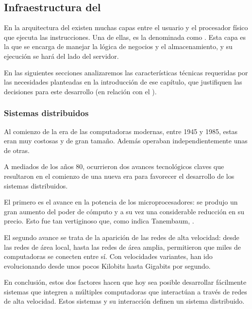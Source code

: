 
\subsection{Infraestructura del }
\label{marco_teorico}

En la arquitectura del  existen muchas capas entre el usuario y el procesador físico que ejecuta las instrucciones. Una de ellas, es la denominada como . Esta capa es la que se encarga de manejar la lógica de negocios y el almacenamiento, y su ejecución se hará del lado del servidor.

En las siguientes secciones analizaremos las características técnicas requeridas por las necesidades planteadas en la introducción de ese capítulo, que justifiquen las decisiones para este desarrollo (en relación con el ).

\subsubsection{Sistemas distribuidos}
\label{sistemas_distribuidos}

Al comienzo de la era de las computadoras modernas, entre 1945 y 1985, estas eran muy costosas y de gran tamaño. Además operaban independientemente unas de otras.

A mediados de los años 80, ocurrieron dos avances tecnológicos claves que resultaron en el comienzo de una nueva era para favorecer el desarrollo de los sistemas distribuidos\cite{artnoema}. 

El primero es el avance en la potencia de los microprocesadores: se produjo un gran aumento del poder de cómputo y a su vez una considerable reducción en su precio. Esto fue tan vertiginoso que, como indica Tanembaum, \cite{tanenbaum2007distributed}.

El segundo avance se trata de la aparición de las redes de alta velocidad: desde las redes de área local, hasta las redes de área amplia, permitieron que miles de computadoras se conecten entre sí. Con velocidades variantes, han ido evolucionando desde unos pocos Kilobits hasta Gigabits por segundo.

En conclusión, estos dos factores hacen que hoy sea posible desarrollar fácilmente sistemas que integren a múltiples computadoras que interactúan a través de redes de alta velocidad.
Estos sistemas y su interacción definen un sistema distribuido.

